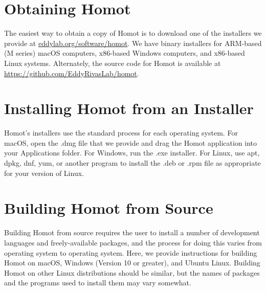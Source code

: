 \documentclass[notoc,justified,openany]{tufte-book}    %
\newcommand{\homot }{{Homot}\xspace}  %
\newcommand{\macos}{{macOS}\xspace}
\newcommand{\homotloc}{\url{eddylab.org/software/homot}\xspace}
\begin{document}
\section{Obtaining \homot}
The easiest way to obtain a copy of \homot is to download one of the installers we provide at \homotloc.  We have binary installers for ARM-based (M series) {macOS} computers, x86-based Windows computers, and x86-based Linux systems.  Alternately, the source code for \homot is available at \url{https://github.com/EddyRivasLab/homot}.

\section{Installing \homot from an Installer}
\homot's installers use the standard process for each operating system.  For {macOS}, open the .dmg file that we provide and drag the \homot application into your Applications folder.  For Windows, run the .exe installer.  For Linux, use apt, dpkg, dnf, yum, or another program to install the .deb or .rpm file as appropriate for your version of Linux.

\section{Building \homot from Source}
Building \homot from source requires the user to install a number of development languages and freely-available packages, and the process for doing this varies from operating system to operating system.  Here, we provide instructions for building \homot on \macos, Windows (Version 10 or greater), and Ubuntu Linux.  Building \homot on other Linux distributions should be similar, but the names of packages and the programs used to install them may vary somewhat.
\end{document}
